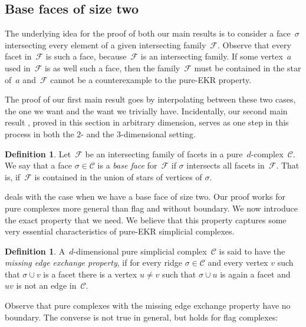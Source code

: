 \documentclass[a4paper,12pt]{amsart}
\theoremstyle{plain}
\theoremstyle{definition}
\newtheorem{definition}[theorem]{Definition}
\newcommand{\darkred}{\color{darkred}} %
\newcommand{\C}{\mathcal C}
\newcommand{\family}{\mathcal F}
\newcommand{\face}{\sigma}
\newcommand{\defn}[1]{\emph{\darkred #1}} %
\begin{document}
\subsection{Base faces of size two}
\label{ssec:proofarbdim}

The underlying idea for the proof of both our main results is to consider a face~$\face$ intersecting every element of a given intersecting family~$\family$.
Observe that every facet in~$\family$ is such a face, because~$\family$ is an intersecting family.
If some vertex~$a$ used in~$\family$ is as well such a face, then the family~$\family$ must be contained in the star of~$a$ and~$\family$ cannot be a counterexample to the pure-EKR property. 

The proof of our first main result  goes by interpolating between these two cases, the one we want and the want we trivially have. Incidentally, our second main result , proved in this section in arbitrary dimension, serves as one step in this process in both the $2$- and the $3$-dimensional setting.

\begin{definition}
  Let~$\family$ be an intersecting family of facets in a pure~$d$-complex~$\C$.
  We say that a face $\face \in \C$ is a \defn{base face} for~$\family$ if $\face$ intersects all facets in~$\family$.
  That is, if~$\family$ is contained in the union of stars of vertices of $\face$.
\end{definition}

 deals with the case when we have a base face of size two.
Our proof works for pure complexes more general than flag and without boundary. We now introduce the exact property that we need. We believe that this property captures some very essential characteristics of pure-EKR simplicial complexes. 

\begin{definition}
  \label{def:meep}
  A~$d$-dimensional pure simplicial complex~$\C$ is said to have the \defn{missing edge exchange property}, if for every ridge $\face \in \C$ and every vertex $v$ such that $\face \cup v$ is a facet there is a vertex $u\ne v$ such that $\face \cup u$ is again a facet and $uv$ is not an edge in~$\C$.
\end{definition}

Observe that  pure complexes with the missing edge exchange property have no boundary. The converse is not true in general, but holds for flag complexes:
\end{document}
